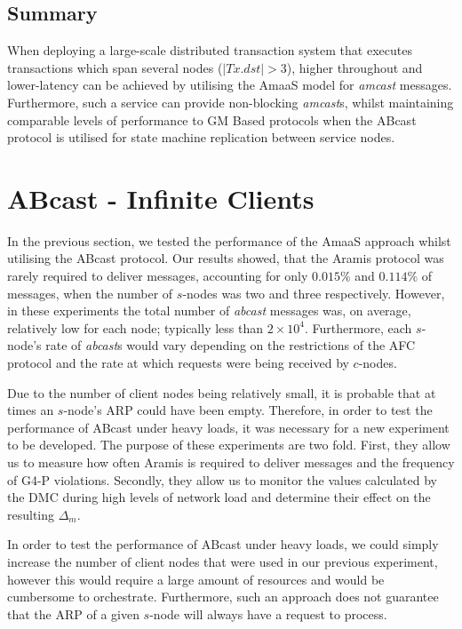 	\subsection{Summary}
	When deploying a large-scale distributed transaction system that executes transactions which span several nodes ($|Tx.dst| > 3$), higher throughout and lower-latency can be achieved by utilising the \textsf{AmaaS} model for \emph{amcast} messages.  Furthermore, such a service can provide non-blocking \emph{amcast}s, whilst maintaining comparable levels of performance to GM Based protocols when the  \textsf{ABcast} protocol is utilised for state machine replication between service nodes.  

\section{ABcast - Infinite Clients}\label{sec:infinite_clients_eval}
    In the previous section, we tested the performance of the \textsf{AmaaS} approach whilst utilising the \textsf{ABcast} protocol.  Our results showed, that the \textsf{Aramis} protocol was rarely required to deliver messages, accounting for only $0.015\%$ and $0.114\%$ of messages, when the number of $s$-nodes was two and three respectively.  However, in these experiments the total number of \emph{abcast} messages was, on average, relatively low for each node; typically less than $2 \times 10^4$.  Furthermore, each $s$-node's rate of \emph{abcast}s would vary depending on the restrictions of the AFC protocol and the rate at which requests were being received by $c$-nodes.  
    
    Due to the number of client nodes being relatively small, it is probable that at times an $s$-node's ARP could have been empty.  Therefore, in order to test the performance of \textsf{ABcast} under heavy loads, it was necessary for a new experiment to be developed.  The purpose of these experiments are two fold.  First, they allow us to measure how often \textsf{Aramis} is required to deliver messages and the frequency of G4-P violations.  Secondly, they allow us to monitor the values calculated by the DMC during high levels of network load and determine their effect on the resulting $\Delta_m$.  
    
    In order to test the performance of \textsf{ABcast} under heavy loads, we could simply increase the number of client nodes that were used in our previous experiment, however this would require a large amount of resources and would be cumbersome to orchestrate.  Furthermore, such an approach does not guarantee that the ARP of a given $s$-node will always have a request to process.  
    
